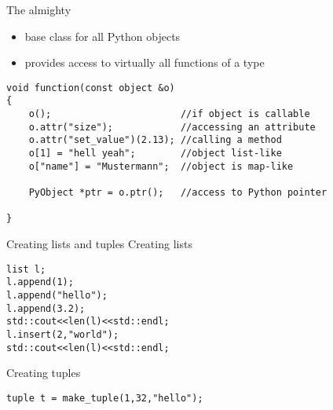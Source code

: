 \begin{frame}[fragile]{The almighty \pyobject}
    \begin{itemize}
        \setlength{\itemsep}{0.05\textheight}
        \item base class for all Python objects
        \item provides access to virtually all functions of a type
    \end{itemize}
    \vspace{0.1\textheight}
    \begin{verbatim}
void function(const object &o)
{
    o();                       //if object is callable
    o.attr("size");            //accessing an attribute
    o.attr("set_value")(2.13); //calling a method
    o[1] = "hell yeah";        //object list-like
    o["name"] = "Mustermann";  //object is map-like

    PyObject *ptr = o.ptr();   //access to Python pointer

}
    \end{verbatim}
\end{frame}
\begin{frame}[fragile]{Creating lists and tuples}
    Creating lists
    \begin{verbatim}
list l;
l.append(1);
l.append("hello");
l.append(3.2);
std::cout<<len(l)<<std::endl;
l.insert(2,"world");
std::cout<<len(l)<<std::endl;
    \end{verbatim}
    
    \vspace{0.1\textheight}
    Creating tuples
    \begin{verbatim}
tuple t = make_tuple(1,32,"hello");
    \end{verbatim}
\end{frame}

